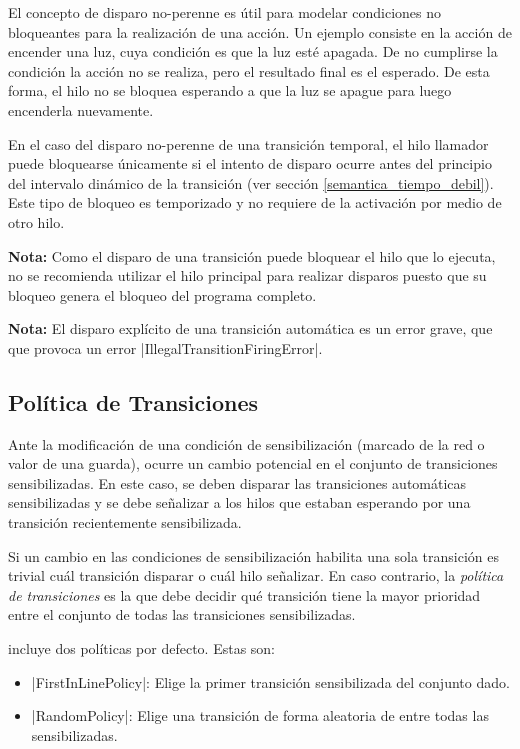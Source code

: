 El concepto de disparo no-perenne es útil para modelar condiciones no
bloqueantes para la realización de una acción. Un ejemplo consiste en la acción
de encender una luz, cuya condición es que la luz esté apagada. De no cumplirse
la condición la acción no se realiza, pero el resultado final es el esperado.
De esta forma, el hilo no se bloquea esperando a que la luz se apague para luego
encenderla nuevamente.

En el caso del disparo no-perenne de una transición temporal, el hilo
llamador puede bloquearse únicamente si el intento de disparo ocurre antes del
principio del intervalo dinámico de la transición (ver sección
\ref{semantica_tiempo_debil}). Este tipo de bloqueo es temporizado y no requiere
de la activación por medio de otro hilo.

\begin{framed}
\textbf{Nota:} Como el disparo de una transición puede bloquear el hilo que lo
ejecuta, no se recomienda utilizar el hilo principal para realizar disparos
puesto que su bloqueo genera el bloqueo del programa completo.
\end{framed}

\begin{framed}
\textbf{Nota:} El disparo explícito de una transición automática es un error
grave, que que provoca un error |IllegalTransitionFiringError|.
\end{framed}

\subsection{Política de Transiciones}
\label{sec:politica_transiciones}
Ante la modificación de una condición de sensibilización (marcado de la red o
valor de una guarda), ocurre un cambio potencial en el conjunto de transiciones
sensibilizadas.
En este caso, se deben disparar las transiciones automáticas sensibilizadas y
se debe señalizar a los hilos que estaban esperando por una transición
recientemente sensibilizada.

Si un cambio en las condiciones de sensibilización habilita una sola
transición es trivial cuál transición disparar o cuál hilo señalizar. En caso
contrario, la \textit{política de transiciones} es la que debe decidir qué
transición tiene la mayor prioridad entre el conjunto de todas las transiciones
sensibilizadas.

\javapetriconcurrencymonitor incluye dos políticas por defecto. Estas son:
\begin{itemize}
    \item {}|FirstInLinePolicy|: Elige la primer transición
    sensibilizada del conjunto dado.
    \item {}|RandomPolicy|: Elige una transición de forma aleatoria de
    entre todas las sensibilizadas.
\end{itemize}

